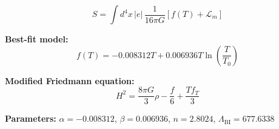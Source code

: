 
\begin{equation}
  S = \int d^4x \, |e| \, \frac{1}{16\pi G} \left[ f(T) + \mathcal{L}_m \right]
\end{equation}

\textbf{Best-fit model:}
\begin{equation}
  f(T) = -0.008312 T + 0.006936 T \ln\!\left(\frac{T}{T_0}\right)
\end{equation}

\textbf{Modified Friedmann equation:}
\begin{equation}
  H^2 = \frac{8\pi G}{3} \rho - \frac{f}{6} + \frac{T f_T}{3}
\end{equation}

\textbf{Parameters:}
$\alpha = -0.008312$, \quad
$\beta = 0.006936$, \quad
$n = 2.8024$, \quad
$\Lambda_{\text{BI}} = 677.6338$